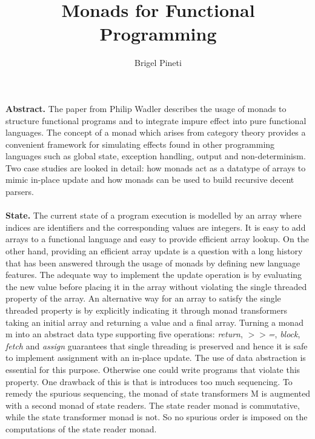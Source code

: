 \documentclass{article}
\title{Monads for Functional Programming}
\author{Brigel Pineti}
\begin{document}
\maketitle

\noindent\textbf{Abstract.} The paper from Philip Wadler describes the usage of monads to structure functional programs and to integrate impure effect into pure functional languages. The concept of a monad which arises from category theory provides a convenient framework for simulating effects found in other programming languages such as global state, exception handling, output and non-determinism. Two case studies are looked in detail: how monads act as a datatype of arrays to mimic in-place update and how monads can be used to build recursive decent parsers. \\ \\
\textbf{State.} The current state of a program execution is modelled by an array where indices are identifiers and the corresponding values are integers. It is easy to add arrays to a functional language and easy to provide efficient array lookup. On the other hand, providing an efficient array update is a question with a long history that has been answered through the usage of monads by defining new language features. The adequate way to implement the update operation is by evaluating the new value before placing it in the array without violating the single threaded property of the array. An alternative way for an array to satisfy the single threaded property is by explicitly indicating it through monad transformers taking an initial array and returning a value and a final array. Turning a monad m into an abstract data type supporting five operations: \textit{return}, \textit{${>>}$=}, \textit{block}, \textit{fetch} and \textit{assign} guarantees that single threading is preserved and hence it is safe to implement assignment with an in-place update. The use of data abstraction is essential for this purpose. Otherwise one could write programs that violate this property. One drawback of this is that is introduces too much sequencing. To remedy the spurious sequencing, the monad of state transformers M is augmented with a second monad of state readers. The state reader monad is commutative, while the state transformer monad is not. So no spurious order is imposed on the computations of the state reader monad. \\ \\
\end{document}
